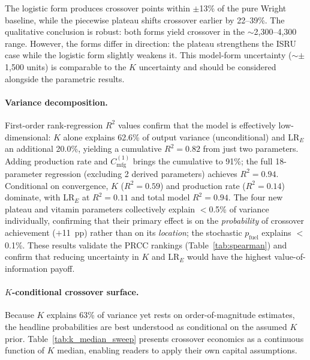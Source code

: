 \documentclass[preprint,12pt]{elsarticle}
\begin{document}
The logistic form produces crossover points within $\pm$13\% of the pure Wright baseline, while the piecewise plateau shifts crossover earlier by 22--39\%. The qualitative conclusion is robust: both forms yield crossover in the $\sim$2{,}300--4{,}300 range. However, the forms differ in direction: the plateau strengthens the ISRU case while the logistic form slightly weakens it. This model-form uncertainty ($\sim$$\pm$1{,}500 units) is comparable to the $K$ uncertainty and should be considered alongside the parametric results.

\paragraph{Variance decomposition.}
\label{sec:sobol}
First-order rank-regression $R^2$ values confirm that the model is effectively low-dimensional: $K$ alone explains 62.6\% of output variance (unconditional) and LR$_E$ an additional 20.0\%, yielding a cumulative $R^2 = 0.82$ from just two parameters. Adding production rate and $C_{\mathrm{mfg}}^{(1)}$ brings the cumulative to 91\%; the full 18-parameter regression (excluding 2 derived parameters) achieves $R^2 = 0.94$. Conditional on convergence, $K$ ($R^2 = 0.59$) and production rate ($R^2 = 0.14$) dominate, with LR$_E$ at $R^2 = 0.11$ and total model $R^2 = 0.94$. The four new plateau and vitamin parameters collectively explain $<$0.5\% of variance individually, confirming that their primary effect is on the \emph{probability} of crossover achievement ($+$11~pp) rather than on its \emph{location}; the stochastic $p_{\mathrm{fuel}}$ explains $<$0.1\%. These results validate the PRCC rankings (Table~\ref{tab:spearman}) and confirm that reducing uncertainty in $K$ and LR$_E$ would have the highest value-of-information payoff.

\paragraph{$K$-conditional crossover surface.} Because $K$ explains 63\% of variance yet rests on order-of-magnitude estimates, the headline probabilities are best understood as conditional on the assumed $K$ prior. Table~\ref{tab:k_median_sweep} presents crossover economics as a continuous function of $K$ median, enabling readers to apply their own capital assumptions.
\end{document}
